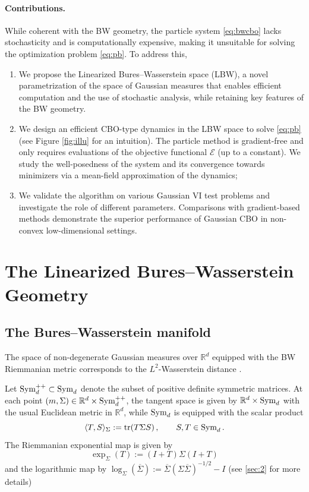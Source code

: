 \documentclass{article}
\theoremstyle{plain}
\theoremstyle{definition}
\theoremstyle{remark}
\newcommand{\Rd}{ {\mathbb{R}^d}}
\newcommand{\E}{\mathcal{E}}
\newcommand{\sym}{\textup{Sym}_d}
\newcommand{\pd}{\textup{Sym}^{++}_d}
\newcommand{\tr}{\textup{tr}}
\newcommand{\rev}{}
\begin{document}
\paragraph{Contributions.} While coherent with the BW geometry, the particle system \eqref{eq:bwcbo} lacks stochasticity and is computationally expensive, making it unsuitable for solving the optimization problem \eqref{eq:pb}. To address this, 
\begin{enumerate}[label=\roman*)]
\item We propose the Linearized Bures--Wasserstein space (LBW), a novel parametrization of the space of Gaussian measures that enables efficient computation and the use of stochastic analysis, while retaining key features of the BW geometry. 

\item We design an efficient CBO-type dynamics in the LBW space to solve \eqref{eq:pb} (see Figure \ref{fig:illu} for an intuition). The particle method is gradient-free and only requires evaluations of the objective functional $\E$ (up to a  constant). We study the well-posedness of the system and its convergence towards minimizers via a mean-field approximation of the dynamics;

\item We validate the algorithm on various Gaussian VI test problems and investigate the role of different parameters. Comparisons with gradient-based methods demonstrate the superior performance of Gaussian CBO in non-convex \rev{low-dimensional} settings.
\end{enumerate}



\section{The Linearized Bures--Wasserstein Geometry}


\subsection{The Bures--Wasserstein manifold}

The space of non-degenerate Gaussian measures over $\Rd$ equipped with the BW Riemmanian metric corresponds to the $L^2$-Wasserstein distance \citep{takatsu2011,Malago2018,bathia2019}. 

Let $\pd\subset \sym$ denote the subset of positive definite symmetric matrices. At each point $(m,\Sigma) \in \Rd \times \pd$, the tangent space is given by $\Rd \times \sym$ with the usual Euclidean metric in $\Rd$, while $\sym$ is equipped with the scalar product
\[
\langle T, S \rangle_{\Sigma} := \tr(T\Sigma S)\,, \qquad S,T\in \sym\,.
\]
The Riemmanian exponential map is given by
\begin{equation} \label{eq:expBW}
\exp_\Sigma(T) := ( I + T) \Sigma(I + T)
\end{equation}
and the logarithmic map by $\log_\Sigma(\overline{\Sigma}) := \overline{\Sigma}(\Sigma \overline{\Sigma})^{-1/2} - I$ (see \cref{sec:2} for more details)
\end{document}
